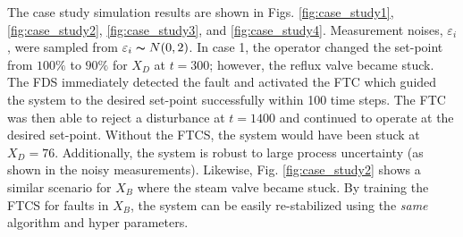 The case study simulation results are shown in Figs. \ref{fig:case_study1}, \ref{fig:case_study2}, \ref{fig:case_study3}, and \ref{fig:case_study4}. Measurement noises, $\varepsilon_i$, were sampled from $\varepsilon_i \thicksim N(0, 2)$. In case 1, the operator changed the set-point from $100\%$ to $90\%$ for $X_D$ at $t = 300$; however, the reflux valve became stuck. The FDS immediately detected the fault and activated the FTC which guided the system to the desired set-point successfully within 100 time steps. The FTC was then able to reject a disturbance at $t = 1400$ and continued to operate at the desired set-point. Without the FTCS, the system would have been stuck at $X_D = 76$.  Additionally, the system is robust to large process uncertainty (as shown in the noisy measurements). Likewise, Fig. \ref{fig:case_study2} shows a similar scenario for $X_B$ where the steam valve became stuck.  By training the FTCS for faults in $X_B$, the system can be easily re-stabilized using the \textit{same} algorithm and hyper parameters.

